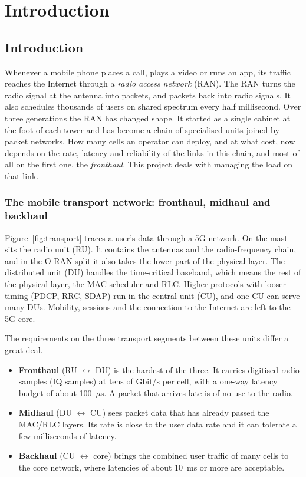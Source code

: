 \chapter{Introduction}
\thispagestyle{plain}

\section{Introduction}

Whenever a mobile phone places a call, plays a video or runs an app, its traffic reaches the Internet through a \emph{radio access network} (RAN). The RAN turns the radio signal at the antenna into packets, and packets back into radio signals. It also schedules thousands of users on shared spectrum every half millisecond. Over three generations the RAN has changed shape. It started as a single cabinet at the foot of each tower and has become a chain of specialised units joined by packet networks. How many cells an operator can deploy, and at what cost, now depends on the rate, latency and reliability of the links in this chain, and most of all on the first one, the \emph{fronthaul}. This project deals with managing the load on that link.

\subsection{The mobile transport network: fronthaul, midhaul and backhaul}

Figure~\ref{fig:transport} traces a user's data through a 5G network. On the mast sits the radio unit (RU). It contains the antennas and the radio-frequency chain, and in the O-RAN split it also takes the lower part of the physical layer. The distributed unit (DU) handles the time-critical baseband, which means the rest of the physical layer, the MAC scheduler and RLC. Higher protocols with looser timing (PDCP, RRC, SDAP) run in the central unit (CU), and one CU can serve many DUs. Mobility, sessions and the connection to the Internet are left to the 5G core.

The requirements on the three transport segments between these units differ a great deal.
\begin{itemize}
  \item \textbf{Fronthaul} (RU $\leftrightarrow$ DU) is the hardest of the three. It carries digitised radio samples (IQ samples) at tens of Gbit/s per cell, with a one-way latency budget of about 100~$\mu$s. A packet that arrives late is of no use to the radio.
  \item \textbf{Midhaul} (DU $\leftrightarrow$ CU) sees packet data that has already passed the MAC/RLC layers. Its rate is close to the user data rate and it can tolerate a few milliseconds of latency.
  \item \textbf{Backhaul} (CU $\leftrightarrow$ core) brings the combined user traffic of many cells to the core network, where latencies of about 10~ms or more are acceptable.
\end{itemize}

